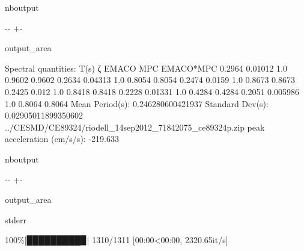 \documentclass[letterpaper,10pt,english]{sphinxmanual}
\begin{document}
\begin{sphinxuseclass}{nboutput}
{

\kern-\sphinxverbatimsmallskipamount\kern-\baselineskip
\kern+\FrameHeightAdjust\kern-\fboxrule
\vspace{\nbsphinxcodecellspacing}

\begin{sphinxuseclass}{output_area}
\begin{sphinxuseclass}{}


\begin{sphinxVerbatim}[commandchars=\\\{\}]
Spectral quantities:
       T(s)        ζ        EMACO        MPC     EMACO*MPC
      0.2964     0.01012    1.0        0.9602     0.9602
      0.2634     0.04313    1.0        0.8054     0.8054
      0.2474     0.0159     1.0        0.8673     0.8673
      0.2425     0.012      1.0        0.8418     0.8418
      0.2228     0.01331    1.0        0.4284     0.4284
      0.2051     0.005986   1.0        0.8064     0.8064
Mean Period(s): 0.246280600421937
Standard Dev(s): 0.02905011899350602
../CESMD/CE89324/riodell\_14sep2012\_71842075\_ce89324p.zip
peak acceleration (cm/s/s): -219.633
\end{sphinxVerbatim}



\end{sphinxuseclass}
\end{sphinxuseclass}
}

\end{sphinxuseclass}
\begin{sphinxuseclass}{nboutput}
{

\kern-\sphinxverbatimsmallskipamount\kern-\baselineskip
\kern+\FrameHeightAdjust\kern-\fboxrule
\vspace{\nbsphinxcodecellspacing}

\begin{sphinxuseclass}{output_area}
\begin{sphinxuseclass}{stderr}


\begin{sphinxVerbatim}[commandchars=\\\{\}]
100\%|█████████▉| 1310/1311 [00:00<00:00, 2320.65it/s]
\end{sphinxVerbatim}



\end{sphinxuseclass}
\end{sphinxuseclass}
}

\end{sphinxuseclass}
\end{document}
